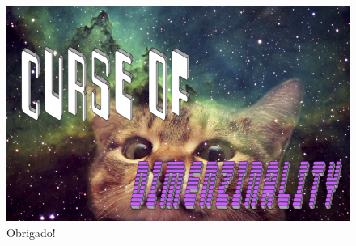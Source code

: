 \documentclass{beamer}
\begin{document}

\begin{frame}
\begin{figure}
	\centering
	\includegraphics[width=0.7\linewidth]{curse-of-dimensionality}
	\caption{Obrigado!}
	\label{fig:curse-of-dimensionality}
\end{figure}

\end{frame}

\end{document}
